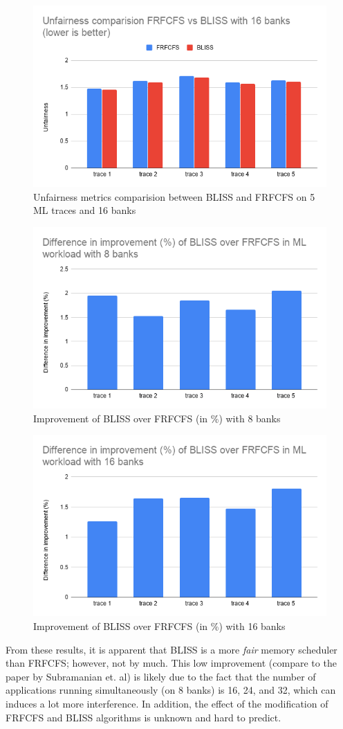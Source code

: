 \documentclass[letterpaper, 11pt]{article}
\begin{document}
\begin{figure}[htb!]
	\centering
	\includegraphics[width=0.7\linewidth]{unfair_16banks.png}
	\caption{Unfairness metrics comparision between BLISS and FRFCFS on 5 ML traces and 16 banks}
	\label{fig2}
\end{figure}

\begin{figure}[htb!]
	\centering
	\includegraphics[width=0.7\linewidth]{improvement_8banks.png}
	\caption{Improvement of BLISS over FRFCFS (in \%) with 8 banks}
	\label{fig3}
\end{figure}

\begin{figure}[htb!]
	\centering
	\includegraphics[width=0.7\linewidth]{improvement_16banks.png}
	\caption{Improvement of BLISS over FRFCFS (in \%) with 16 banks}
	\label{fig4}
\end{figure}

\newpage

From these results, it is apparent that BLISS is a more \textit{fair} memory scheduler than FRFCFS; however, not by much. This low improvement (compare to the paper by Subramanian et. al) is likely due to the fact that the number of applications running simultaneously (on 8 banks) is 16, 24, and 32, which can induces a lot more interference. In addition, the effect of the modification of FRFCFS and BLISS algorithms is unknown and hard to predict. 
\end{document}
